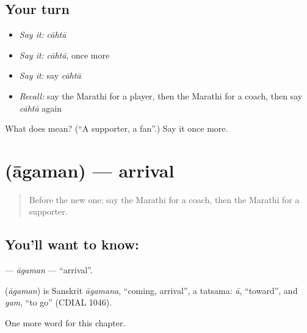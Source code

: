 \subsection*{Your turn}
\begin{itemize}
\raggedright
  \item \emph{Say it:} \emph{cāhtā}
  \item \emph{Say it:} \emph{cāhtā}, once more
  \item \emph{Say it:} say \emph{cāhtā}
  \item \emph{Recall:} say the Marathi for a player, then the Marathi for a coach, then say \emph{cāhtā} again
\end{itemize}

\begin{tcolorbox}[breakable,colback=teal!4,colframe=teal!35!black,title={Before you move on}]
What does  mean? (\textquotedblleft{}A supporter, a fan\textquotedblright{}.) Say it once more.
\end{tcolorbox}
\section[\texorpdfstring{\mr{आगमन} (āgaman)}{आगमन (āgaman)}]{ (āgaman) — arrival}

\label{lesson:MR-C215-agaman}



\begin{quote}
Before the new one: say the Marathi for a coach, then the Marathi for a supporter.
\end{quote}

\subsection*{You'll want to know: }
\textbf{} — \emph{āgaman} — \textquotedblleft{}arrival\textquotedblright{}.

\begin{cousinweb}
\textbf{} (\emph{āgaman}) is Sanskrit \emph{āgamana}, \textquotedblleft{}coming, arrival\textquotedblright{}, a tatsama: \emph{ā}, \textquotedblleft{}toward\textquotedblright{}, and \emph{gam}, \textquotedblleft{}to go\textquotedblright{} (CDIAL 1046).
\end{cousinweb}

\begin{grammarlens}[title={What you've built}]
One more word for this chapter.
\end{grammarlens}

